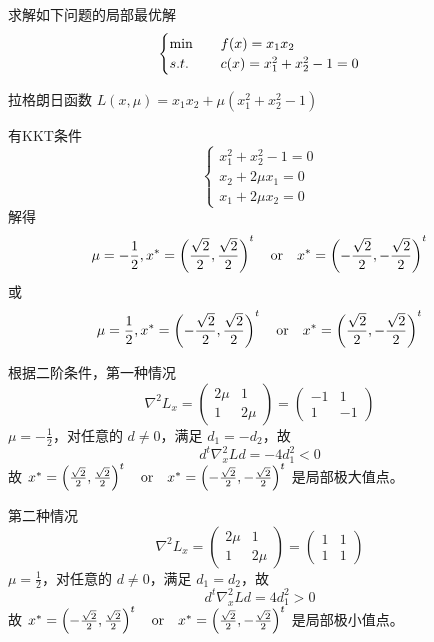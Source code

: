 \begin{example}
    求解如下问题的局部最优解
    \[
        \begin{cases}
            \min \quad &f(x) = x_1x_2\\
            s.t. \quad &c(x) = x_1^2 + x_2^2 - 1 = 0
        \end{cases}    
    \]

    \answer 拉格朗日函数 $L(x, \mu) = x_1x_2 + \mu(x_1^2 + x_2^2 - 1)$

    有KKT条件
    \[
        \begin{cases}
            x_1^2 + x_2^2 - 1 = 0\\
            x_2 + 2\mu x_1 = 0\\
            x_1 + 2\mu x_2 = 0
        \end{cases}    
    \]
    解得 
    \[
        \mu = -\frac{1}{2}, x^* = \left(\frac{\sqrt{2}}{2}, \frac{\sqrt{2}}{2}\right)^t \qor x^* = \left(-\frac{\sqrt{2}}{2}, -\frac{\sqrt{2}}{2}\right)^t
    \]
    或
    \[
        \mu = \frac{1}{2}, x^* = \left(-\frac{\sqrt{2}}{2}, \frac{\sqrt{2}}{2}\right)^t \qor x^* = \left(\frac{\sqrt{2}}{2}, -\frac{\sqrt{2}}{2}\right)^t
    \]

    根据二阶条件，第一种情况
    \[
        \nabla^2L_x = \begin{pmatrix}
            2\mu & 1\\
            1 & 2\mu
        \end{pmatrix} = \begin{pmatrix}
            -1 & 1\\
            1 & -1
        \end{pmatrix}
    \]
    $\mu = -\frac{1}{2}$，对任意的 $d\neq 0$，满足 $d_1 = -d_2$，故
    \[
        d^t\nabla^2_xLd = -4d_1^2 < 0
    \]
    故 $x^* = \left(\frac{\sqrt{2}}{2}, \frac{\sqrt{2}}{2}\right)^t \qor x^* = \left(-\frac{\sqrt{2}}{2}, -\frac{\sqrt{2}}{2}\right)^t$ 是局部极大值点。

    第二种情况
    \[
        \nabla^2L_x = \begin{pmatrix}
            2\mu & 1\\
            1 & 2\mu
        \end{pmatrix} = \begin{pmatrix}
            1 & 1\\
            1 & 1
        \end{pmatrix}
    \]
    $\mu = \frac{1}{2}$，对任意的 $d\neq 0$，满足 $d_1 = d_2$，故
    \[
        d^t\nabla^2_xLd = 4d_1^2 > 0
    \]
    故 $x^* = \left(-\frac{\sqrt{2}}{2}, \frac{\sqrt{2}}{2}\right)^t \qor x^* = \left(\frac{\sqrt{2}}{2}, -\frac{\sqrt{2}}{2}\right)^t$ 是局部极小值点。
\end{example}